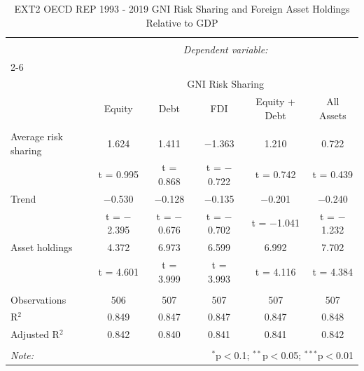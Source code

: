 
\begin{table}[!htbp] \centering 
  \caption{EXT2 OECD REP 1993 - 2019 GNI Risk Sharing and Foreign Asset Holdings Relative to GDP} 
  \label{} 
\begin{tabular}{@{\extracolsep{5pt}}lccccc} 
\\[-1.8ex]\hline 
\hline \\[-1.8ex] 
 & \multicolumn{5}{c}{\textit{Dependent variable:}} \\ 
\cline{2-6} 
\\[-1.8ex] & \multicolumn{5}{c}{GNI Risk Sharing} \\ 
 & Equity & Debt & FDI & Equity + Debt & All Assets \\ 
\hline \\[-1.8ex] 
 Average risk sharing & 1.624 & 1.411 & $-$1.363 & 1.210 & 0.722 \\ 
  & t = 0.995 & t = 0.868 & t = $-$0.722 & t = 0.742 & t = 0.439 \\ 
  Trend & $-$0.530 & $-$0.128 & $-$0.135 & $-$0.201 & $-$0.240 \\ 
  & t = $-$2.395 & t = $-$0.676 & t = $-$0.702 & t = $-$1.041 & t = $-$1.232 \\ 
  Asset holdings & 4.372 & 6.973 & 6.599 & 6.992 & 7.702 \\ 
  & t = 4.601 & t = 3.999 & t = 3.993 & t = 4.116 & t = 4.384 \\ 
 \hline \\[-1.8ex] 
Observations & 506 & 507 & 507 & 507 & 507 \\ 
R$^{2}$ & 0.849 & 0.847 & 0.847 & 0.847 & 0.848 \\ 
Adjusted R$^{2}$ & 0.842 & 0.840 & 0.841 & 0.841 & 0.842 \\ 
\hline 
\hline \\[-1.8ex] 
\textit{Note:}  & \multicolumn{5}{r}{$^{*}$p$<$0.1; $^{**}$p$<$0.05; $^{***}$p$<$0.01} \\ 
\end{tabular} 
\end{table} 
